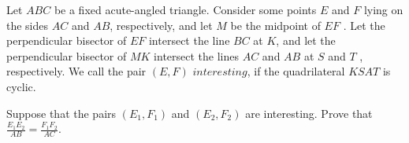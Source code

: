 Let 
$ABC$
 be a fixed acute-angled triangle. Consider some points 
$E$
 and 
$F$
 lying on the sides 
$AC$
 and 
$AB$, 
 respectively, and let 
$M$
 be the midpoint of 
$EF$
 . Let the perpendicular bisector of 
$EF$
 intersect the line 
$BC$
 at 
$K$, 
 and let the perpendicular bisector of 
$MK$
 intersect the lines 
$AC$
 and 
$AB$
 at 
$S$
 and 
$T$
 , respectively. We call the pair 
$(E, F )$
$\textit{interesting}$, 
 if the quadrilateral 
$KSAT$
 is cyclic.


Suppose that the pairs 
$(E_1, F_1)$
 and 
$(E_2, F_2)$
 are interesting. Prove that 
$\displaystyle\frac{E_1 E_2}{AB}=\frac{F_1 F_2}{AC}$.
